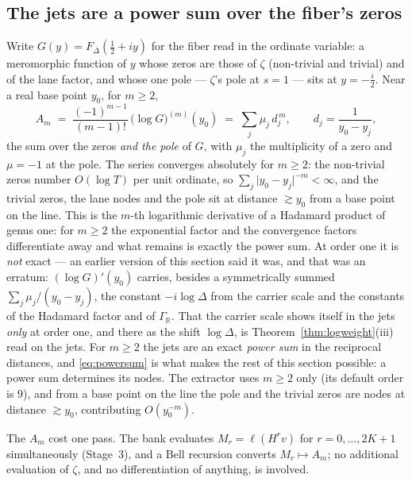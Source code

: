 \documentclass[11pt]{article}
\theoremstyle{plain}
\theoremstyle{definition}
\theoremstyle{remark}
\begin{document}
\subsection{The jets are a power sum over the fiber's zeros}
Write $G(y)=F_\Delta(\tfrac12+iy)$ for the fiber read in the ordinate variable: a
meromorphic function of $y$ whose zeros are those of $\zeta$ (non-trivial and trivial)
and of the lane factor, and whose one pole --- $\zeta$'s pole at $s=1$ --- sits at
$y=-\tfrac{i}{2}$. Near a real base point $y_0$, for $m\ge2$,
\begin{equation}\label{eq:powersum}
  A_m\;=\;\frac{(-1)^{m-1}}{(m-1)!}\,\bigl(\log G\bigr)^{(m)}(y_0)
  \;=\;\sum_j \mu_j\,d_j^{\,m},
  \qquad d_j=\frac{1}{y_0-y_j},
\end{equation}
the sum over the zeros \emph{and the pole} of $G$, with $\mu_j$ the multiplicity of a
zero and $\mu=-1$ at the pole. The series converges absolutely for $m\ge2$: the
non-trivial zeros number $O(\log T)$ per unit ordinate, so
$\sum_j\lvert y_0-y_j\rvert^{-m}<\infty$, and the trivial zeros, the lane nodes and the
pole sit at distance $\gtrsim y_0$ from a base point on the line. This is the $m$-th
logarithmic derivative of a Hadamard
product of genus one: for $m\ge2$ the exponential factor and the convergence factors
differentiate away and what remains is exactly the power sum. At order one it is
\emph{not} exact --- an earlier version of this section said it was, and that was an
erratum: $(\log G)'(y_0)$ carries, besides a symmetrically summed
$\sum_j\mu_j/(y_0-y_j)$, the constant $-i\log\Delta$ from the carrier scale and the
constants of the Hadamard factor and of $\Gamma_{\mathbb R}$. That the carrier scale
shows itself in the jets \emph{only} at order one, and there as the shift $\log\Delta$,
is Theorem~\ref{thm:logweight}(iii) read on the jets. For $m\ge2$ the jets are an exact
\emph{power sum} in the reciprocal distances, and \eqref{eq:powersum} is what makes the
rest of this section possible: a power sum determines its nodes. The extractor uses
$m\ge2$ only (its default order is $9$), and from a base point on the line the pole and
the trivial zeros are nodes at distance $\gtrsim y_0$, contributing $O(y_0^{-m})$.

The $A_m$ cost one pass. The bank evaluates $M_r=\ell(H^rv)$ for $r=0,\dots,2K+1$
simultaneously (Stage~3), and a Bell recursion converts $M_r\mapsto A_m$; no additional
evaluation of $\zeta$, and no differentiation of anything, is involved.
\end{document}
